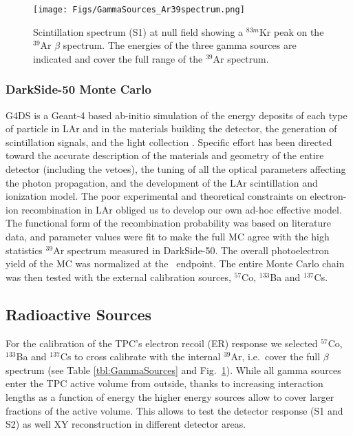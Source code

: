 \begin{figure}[htbp]
 \centering
 \texttt{[image: Figs/GammaSources\_Ar39spectrum.png]}
 \caption{Scintillation spectrum (S1) at null field showing a $^{83m}$Kr peak on the $^{39}$Ar $\beta$ spectrum. The energies of the three gamma sources are indicated and cover the full range of the $^{39}$Ar spectrum.
\label{fig:GammaSources_Ar39spectrum}}
\end{figure}

\subsubsection*{DarkSide-50 Monte Carlo}
G4DS is a Geant-4 based ab-initio simulation of the energy deposits of each type of particle in LAr and in the materials building the detector, the generation of scintillation signals, and the light collection \cite{DS50:G4DS:paper}. Specific effort has been directed toward the accurate description of the materials and geometry of the entire detector (including the vetoes), the tuning of all the optical parameters affecting the photon propagation, and  the development of the LAr scintillation and ionization model. 
The poor experimental and theoretical constraints on electron-ion recombination in LAr obliged us to develop our own ad-hoc effective model. The functional form of the recombination probability was based on literature data, and parameter values were fit to make the full MC agree with the high statistics $^{39}$Ar spectrum measured in DarkSide-50. The overall photoelectron yield of the MC was normalized at the \ar\ endpoint. The entire Monte Carlo chain was then tested with the external calibration sources, $^{57}$Co, $^{133}$Ba and $^{137}$Cs. 


\subsection{Radioactive Sources}

For the calibration of the TPC's electron recoil (ER) response we selected $^{57}$Co, $^{133}$Ba and $^{137}$Cs to cross calibrate with the internal $^{39}$Ar, i.e.~cover the full $\beta$ spectrum (see Table \ref{tbl:GammaSources} and Fig.~\ref{fig:GammaSources_Ar39spectrum}). While all gamma sources enter the TPC active volume from outside, thanks to increasing interaction lengths as a function of energy the higher energy sources allow to cover larger fractions of the active volume. This allows to test the detector response (S1 and S2) as well XY reconstruction in different detector areas. 

